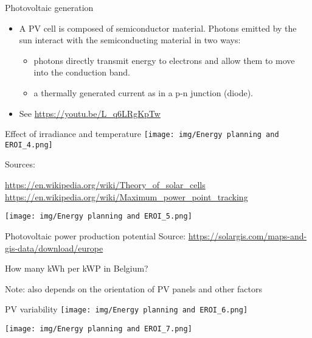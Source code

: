 \begin{frame}{Photovoltaic generation}
\label{photovoltaic-generation}
\begin{itemize}
\tightlist
\item
  A PV cell is composed of semiconductor material. Photons emitted by
  the sun interact with the semiconducting material in two ways:

  \begin{itemize}
  \tightlist
  \item
    photons directly transmit energy to electrons and allow them to move
    into the conduction band.
  \item
    a thermally generated current as in a p-n junction (diode).
  \end{itemize}
\item
  See \url{https://youtu.be/L_q6LRgKpTw}
\end{itemize}
\end{frame}

\begin{frame}{Effect of irradiance and temperature}
\label{effect-of-irradiance-and-temperature}
\texttt{[image: img/Energy planning and EROI\_4.png]}

{Sources:}

{\url{https://en.wikipedia.org/wiki/Theory_of_solar_cells}}
{\url{https://en.wikipedia.org/wiki/Maximum_power_point_tracking}}

\texttt{[image: img/Energy planning and EROI\_5.png]}
\end{frame}

\begin{frame}{Photovoltaic power production potential}
\label{photovoltaic-power-production-potential}
Source: \url{https://solargis.com/maps-and-gis-data/download/europe}

How many kWh per kWP in Belgium?

Note: also depends on the orientation of PV panels and other factors
\end{frame}

\begin{frame}{PV variability}
\label{pv-variability}
\texttt{[image: img/Energy planning and EROI\_6.png]}

\texttt{[image: img/Energy planning and EROI\_7.png]}
\end{frame}

